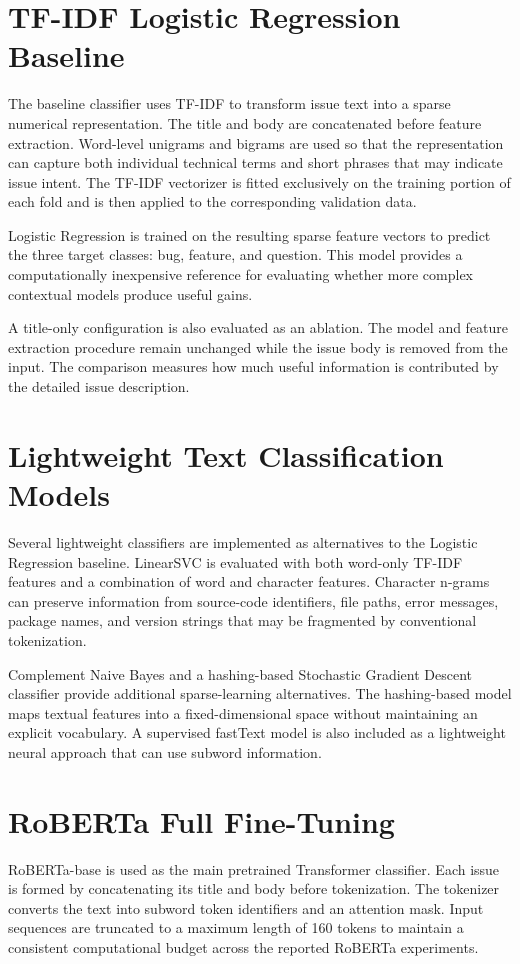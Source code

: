 \section{TF-IDF Logistic Regression Baseline}
The baseline classifier uses TF-IDF to transform issue text into a sparse numerical representation. The title and body are concatenated before feature extraction. Word-level unigrams and bigrams are used so that the representation can capture both individual technical terms and short phrases that may indicate issue intent. The TF-IDF vectorizer is fitted exclusively on the training portion of each fold and is then applied to the corresponding validation data.

Logistic Regression is trained on the resulting sparse feature vectors to predict the three target classes: bug, feature, and question. This model provides a computationally inexpensive reference for evaluating whether more complex contextual models produce useful gains.

A title-only configuration is also evaluated as an ablation. The model and feature extraction procedure remain unchanged while the issue body is removed from the input. The comparison measures how much useful information is contributed by the detailed issue description.

\section{Lightweight Text Classification Models}
Several lightweight classifiers are implemented as alternatives to the Logistic Regression baseline. LinearSVC is evaluated with both word-only TF-IDF features and a combination of word and character features. Character n-grams can preserve information from source-code identifiers, file paths, error messages, package names, and version strings that may be fragmented by conventional tokenization.

Complement Naive Bayes and a hashing-based Stochastic Gradient Descent classifier provide additional sparse-learning alternatives. The hashing-based model maps textual features into a fixed-dimensional space without maintaining an explicit vocabulary. A supervised fastText model is also included as a lightweight neural approach that can use subword information.

\section{RoBERTa Full Fine-Tuning}
RoBERTa-base is used as the main pretrained Transformer classifier. Each issue is formed by concatenating its title and body before tokenization. The tokenizer converts the text into subword token identifiers and an attention mask. Input sequences are truncated to a maximum length of 160 tokens to maintain a consistent computational budget across the reported RoBERTa experiments.

